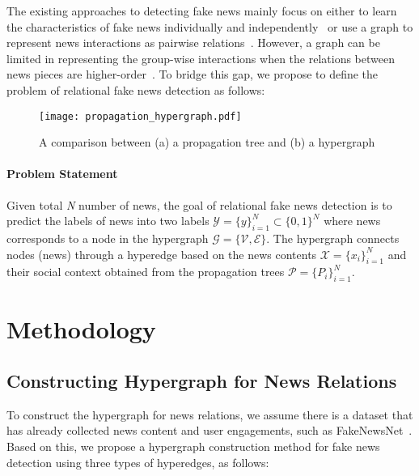 \documentclass[conference]{IEEEtran}
\begin{document}
\hfill





The existing approaches to detecting fake news mainly focus on either to learn the characteristics of fake news individually and independently~\cite{riedel2017simple, shu2019defend} or use a graph to represent news interactions as pairwise relations~\cite{monti2019fake, ren2021fake}. However, a graph can be limited in representing the group-wise interactions when the relations between news pieces are higher-order~\cite{zhou2006learning}. To bridge this gap, we propose to define the problem of relational fake news detection as follows:

\begin{figure}
\centering
\texttt{[image: propagation\_hypergraph.pdf]}
\caption{A comparison between (a) a propagation tree and (b) a hypergraph} \label{ComparePropagationHypergraph}
\end{figure}
\hfill

\paragraph{\textbf{Problem Statement}} Given total \textit{N} number of news, the goal of relational fake news detection is to predict the labels of news into two labels $\mathcal{Y} = \{y\}^\mathit{N}_{i=1} \subset \{0, 1\}^\mathit{N}$ where news corresponds to a node in the hypergraph $\mathcal{G} = \{ \mathcal{V}, \mathcal{E} \}$. The hypergraph connects nodes (news) through a hyperedge based on the news contents $\mathcal{X} = \{x_i\}^\mathit{N}_{i=1}$ and their social context obtained from the propagation trees $\mathcal{P} = \{P_i\}^\mathit{N}_{i=1}$.


\section{Methodology}
\subsection{Constructing Hypergraph for News Relations}
\label{Hypergraph_Construction}
To construct the hypergraph for news relations, we assume there is a dataset that has already collected news content and user engagements, such as FakeNewsNet~\cite{shu2020fakenewsnet}. Based on this, we propose a hypergraph construction method for fake news detection using three types of hyperedges, as follows:
\hfill\\
\end{document}
